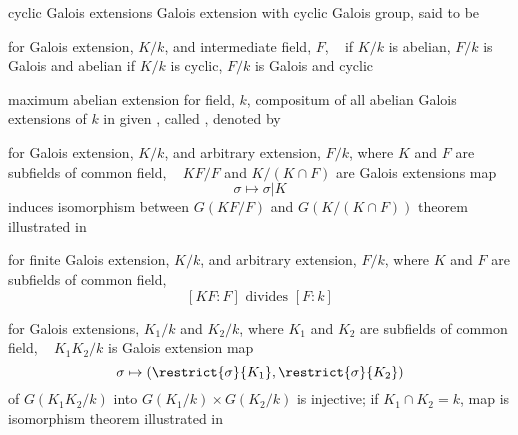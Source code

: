 \documentclass[17pt,landscape]{foils}
\begin{document}
{\begin{mydefinition}{cyclic Galois extensions}
	Galois extension with cyclic Galois group,
	said to be 
\end{mydefinition}

\begin{mycorollary}{}
	for Galois extension, $K/k$,
	and
	intermediate field, $F$,
\shrinkspacewithintheoremslike\
\ibit
\iitem
	if $K/k$ is abelian, $F/k$ is Galois and abelian
\iitem
	if $K/k$ is cyclic, $F/k$ is Galois and cyclic
\eit
\end{mycorollary}

\begin{mydefinition}{maximum abelian extension}
	for field, $k$,
	compositum of all abelian Galois extensions of $k$
	in given ,
	called ,
	denoted by 
\end{mydefinition}



\begin{mytheorem}{}
	for Galois extension, $K/k$,
	and arbitrary extension, $F/k$,
	where $K$ and $F$ are subfields of common field,
	\shrinkspacewithintheoremslike\
	\ibit
	\iitem
		$KF / F$ and $K/(K\cap F)$ are Galois extensions
	\iitem
		map $$\sigma \mapsto \sigma|K$$
		induces
		isomorphism
		between
		$G(KF / F)$ and $G(K/(K\cap F))$
	\eit
	\shrinkspacewithintheoremslike
	theorem illustrated in 
\end{mytheorem}

\begin{figure}
\begin{center}
	\galoisf{3em}
	\idxfig{diagram for Galois lifting}
	\label{fig:diagram for Galois lifting}
\end{center}
\end{figure}

\begin{mycorollary}{}
	for finite Galois extension, $K/k$,
	and arbitrary extension, $F/k$,
	where $K$ and $F$ are subfields of common field,
	$$
		[KF:F] \mbox{ divides } [F:k]
	$$
\end{mycorollary}

\begin{mytheorem}{}
	for Galois extensions, $K_1/k$ and $K_2/k$,
	where $K_1$ and $K_2$ are subfields of common field,
	\shrinkspacewithintheoremslike\
	\ibit
	\iitem
		$K_1K_2/k$ is Galois extension
	\iitem
		map
		$$
			\sigma \mapsto (\restrict{\sigma}{K_1}, \restrict{\sigma}{K_2})
		$$
		of $G(K_1K_2/k)$ into $G(K_1/k) \times G(K_2/k)$
		is injective;
		if $K_1\cap K_2=k$,
		map is isomorphism
	\eit
	theorem illustrated in 
\end{mytheorem}

}
\end{document}
